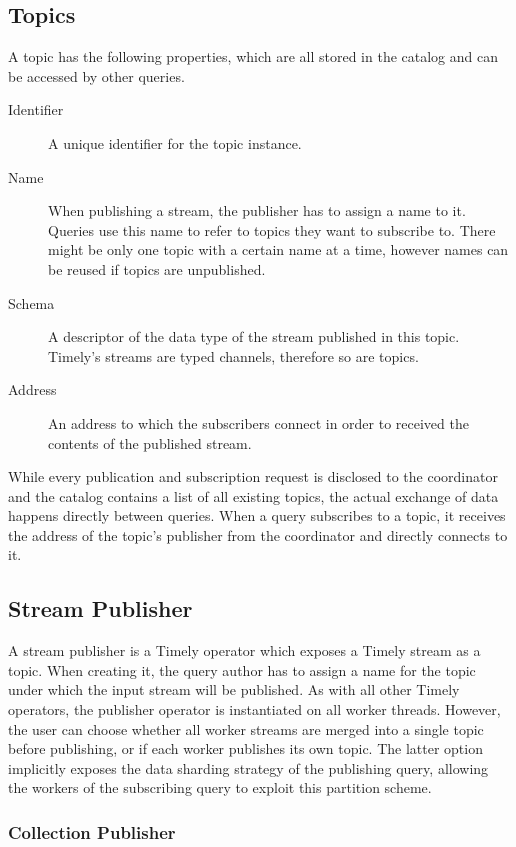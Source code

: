 \subsection{Topics}

A topic has the following properties, which are all stored in the catalog
and can be accessed by other queries.
\begin{description}
\item [Identifier] A unique identifier for the topic instance.
\item [Name] When publishing a stream, the publisher has to assign a name to it.
Queries use this name to refer to topics they want to subscribe to. There might
be only one topic with a certain name at a time, however names can be reused if
topics are unpublished.
\item [Schema] A descriptor of the data type of the stream published in this
topic. Timely's streams are typed channels, therefore so are topics.
\item [Address] An address to which the subscribers connect in order to received
the contents of the published stream.
\end{description}

While every publication and subscription request is disclosed to the coordinator
and the catalog contains a list of all existing topics, the
actual exchange of data happens directly between queries. When a query subscribes
to a topic, it receives the address of the topic's publisher from the coordinator
and directly connects to it.

\subsection{Stream Publisher}

A stream publisher is a Timely operator which exposes a Timely stream as a topic. When
creating it, the query author has to assign a name for the topic under which the
input stream will be published. As with all other Timely operators, the publisher
operator is instantiated on all worker threads. However, the user can choose
whether all worker streams are merged into a single topic before publishing, or
if each worker publishes its own topic. The latter option implicitly exposes
the data sharding strategy of the publishing query, allowing the workers of
the subscribing query to exploit this partition scheme.

\subsubsection{Collection Publisher}

